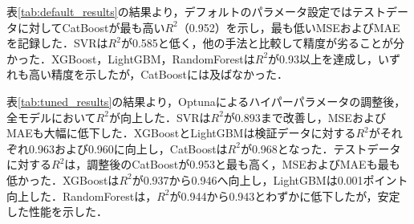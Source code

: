 表\ref{tab:default_results}の結果より，デフォルトのパラメータ設定ではテストデータに対してCatBoostが最も高い$R^2$（0.952）を示し，最も低いMSEおよびMAEを記録した．SVRは$R^2$が0.585と低く，他の手法と比較して精度が劣ることが分かった．XGBoost，LightGBM，RandomForestは$R^2$が0.93以上を達成し，いずれも高い精度を示したが，CatBoostには及ばなかった．

表\ref{tab:tuned_results}の結果より，Optunaによるハイパーパラメータの調整後，全モデルにおいて$R^2$が向上した．SVRは$R^2$が0.893まで改善し，MSEおよびMAEも大幅に低下した．XGBoostとLightGBMは検証データに対する$R^2$がそれぞれ0.963および0.960に向上し，CatBoostは$R^2$が0.968となった．テストデータに対する$R^2$は，調整後のCatBoostが0.953と最も高く，MSEおよびMAEも最も低かった．XGBoostは$R^2$が0.937から0.946へ向上し，LightGBMは0.001ポイント向上した．RandomForestは，$R^2$が0.944から0.943とわずかに低下したが，安定した性能を示した．

